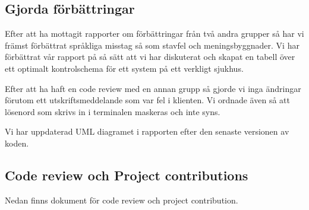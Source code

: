 \documentclass[a4paper]{article}
\begin{document}
\newpage
\subsection{Gjorda förbättringar}

Efter att ha mottagit rapporter om förbättringar från två andra grupper så har vi främst förbättrat språkliga misstag så som stavfel och meningsbyggnader. Vi har förbättrat vår rapport på så sätt att vi har diskuterat och skapat en tabell över ett optimalt kontrolschema för ett system på ett verkligt sjukhus.

Efter att ha haft en code review med en annan grupp så gjorde vi inga ändringar förutom ett utskriftsmeddelande som var fel i klienten. Vi ordnade även så att lösenord som skrivs in i terminalen maskeras och inte syns. 

Vi har uppdaterad UML diagramet i rapporten efter den senaste versionen av koden.

\subsection{Code review och Project contributions}
Nedan finns dokument för code review och project contribution.




\end{document}
